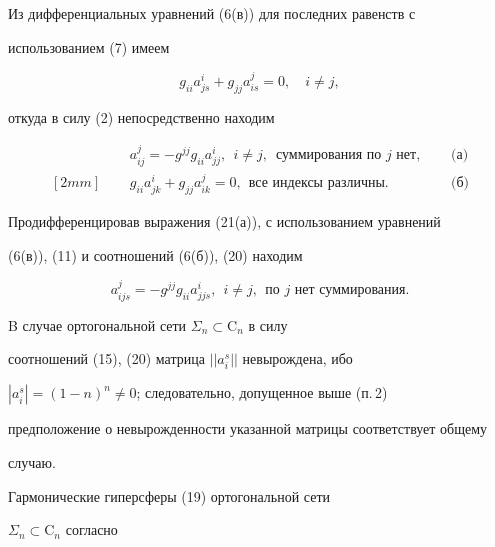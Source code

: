 Из дифференциальных уравнений (6(в)) для последних равенств с 


использованием (7) имеем 


$$ 


g_{ii}a^i_{js}+g_{jj}a^j_{is}=0,\quad i\ne j, 


$$ 


откуда в силу (2) непосредственно находим 


\begin{equation} 


\begin{matrix} 


\ & \ & a^j_{ij}=-g^{jj}g_{ii}a^i_{jj}, 


\ \ i\ne j,\ \; 


\text{суммирования по $j$ нет}, \ & \ & \text{(а)}\\ [2mm]


\ & \ & g_{ii}a^i_{jk}+g_{jj}a^j_{ik}=0, 


\ \ \text{все индексы различны}. \ & \ & \text{(б)} 


\end{matrix} 


\end{equation} 


Продифференцировав выражения (21(а)), с использованием уравнений 


(6(в)), (11) и соотношений (6(б)), (20) находим 


\begin{equation} 


a^j_{ijs}=-g^{jj}g_{ii}a^i_{jjs},\ \ i\ne j, 


\ \ \text{по $j$ нет суммирования}. 


\end{equation} 


 


B случае ортогональной сети $\Sigma_n\subset\mathrm C_n$ в силу 


соотношений (15), (20) матрица $||a^s_i||$ невырождена, ибо 


$|a^s_i|=(1-n)^n\ne0$; следовательно, допущенное выше (п.\,2) 


предположение о невырожденности указанной матрицы соответствует общему 


случаю. 


 


Гармонические гиперсферы (19) ортогональной сети 


$\Sigma_n\subset\mathrm C_n$ согласно 


